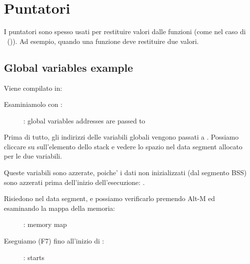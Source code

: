 \section{Puntatori}
\myindex{\CLanguageElements!\Pointers}
\label{label_pointers}

I puntatori sono spesso usati per restituire valori dalle funzioni (come nel caso di \scanf ~()).
Ad esempio, quando una funzione deve restituire due valori.

\subsection{Global variables example}



Viene compilato in:



\myindex{\olly}
\clearpage
Esaminiamolo con \olly:

\begin{figure}[H]
\centering
{}
\caption{\olly: 
global variables addresses are passed to \ttfone}
\label{fig:pointers_olly_global_1}
\end{figure}

Prima di tutto, gli indirizzi delle variabili globali vengono passati a \ttfone.
Possiamo cliccare su  sull'elemento dello stack e vedere lo spazio nel data segment allocato per le due variabili.

\clearpage
Queste variabili sono azzerate, poiche' i dati non inizializzati (dal segmento \ac{BSS}) sono azzerati prima dell'inizio dell'esecuzione: .

Risiedono nel data segment, e possiamo verificarlo premendo Alt-M ed esaminando la mappa della memoria:

\begin{figure}[H]
\centering
{}
\caption{\olly: memory map}
\label{fig:pointers_olly_global_5}
\end{figure}

\clearpage
Eseguiamo (F7) fino all'inizio di \ttfone: 

\begin{figure}[H]
\centering
{}
\caption{\olly: \ttfone starts}
\label{fig:pointers_olly_global_2}
\end{figure}

